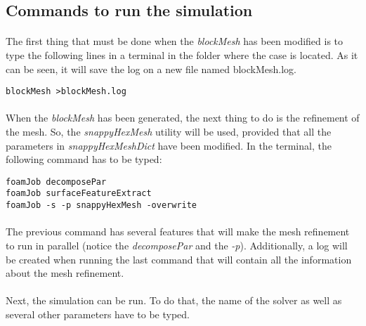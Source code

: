 \subsection{	Commands to run the simulation}

\paragraph{}The first thing that must be done when the \textit{blockMesh} has been modified is to type the following lines in a terminal in the folder where the case is located. As it can be seen, it will save the log on a new file named blockMesh.log.

\begin{center}
\texttt{blockMesh >blockMesh.log}
\end{center}

\paragraph{}When the \textit{blockMesh} has been generated, the next thing to do is the refinement of the mesh. So, the \textit{snappyHexMesh} utility will be used, provided that all the parameters in \textit{snappyHexMeshDict} have been modified. In the terminal, the following command has to be typed:

\begin{center}
\texttt{foamJob decomposePar \\
foamJob surfaceFeatureExtract \\
foamJob -s -p snappyHexMesh -overwrite}
\end{center}

\paragraph{}The previous command has several features that will make the mesh refinement to run in parallel (notice the \textit{decomposePar} and the \textit{-p}). Additionally, a log will be created when running the last command that will contain all the information about the mesh refinement.

\paragraph{}Next, the simulation can be run. To do that, the name of the solver as well as several other parameters have to be typed.
